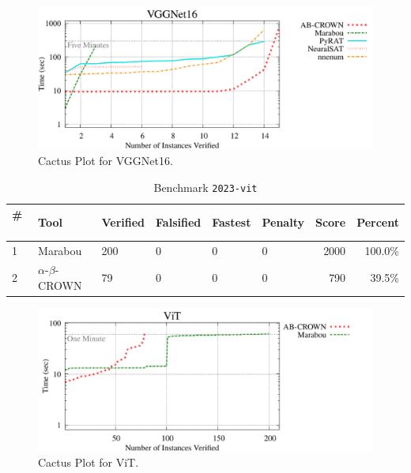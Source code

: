 \begin{figure}[h]
\centerline{\includegraphics[width=\textwidth]{cactus/2023_vggnet16.pdf}}
\caption{Cactus Plot for VGGNet16.}
\label{fig:quantPic}
\end{figure}



\begin{table}[h]
\begin{center}
\caption{Benchmark \texttt{2023-vit}} \label{tab:cat_{cat}}
{\setlength{\tabcolsep}{2pt}
\begin{tabular}[h]{@{}llllllrr@{}}
\toprule
\textbf{\# ~} & \textbf{Tool} & \textbf{Verified} & \textbf{Falsified} & \textbf{Fastest} & \textbf{Penalty} & \textbf{Score} & \textbf{Percent}\\
\midrule
1 & Marabou & 200 & 0 & 0 & 0 & 2000 & 100.0\% \\
2 & $\alpha$-$\beta$-CROWN & 79 & 0 & 0 & 0 & 790 & 39.5\% \\
\bottomrule
\end{tabular}
}
\end{center}
\end{table}



\begin{figure}[h]
\centerline{\includegraphics[width=\textwidth]{cactus/2023_vit.pdf}}
\caption{Cactus Plot for ViT.}
\label{fig:quantPic}
\end{figure}

